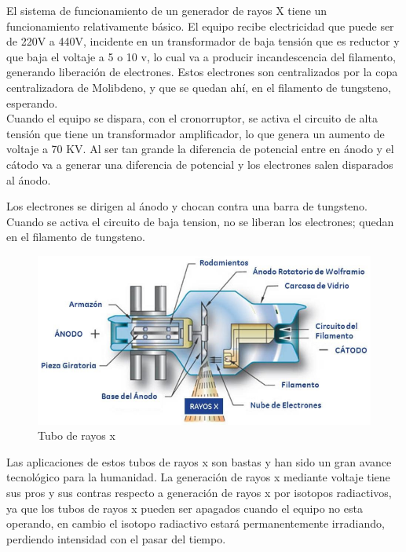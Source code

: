 El sistema de funcionamiento de un generador de rayos X tiene un funcionamiento relativamente básico.  El equipo recibe electricidad que puede ser de 220V a 440V, incidente en un transformador de baja tensión que es reductor y que baja el voltaje a 5 o 10 v, lo cual va a producir incandescencia del filamento, generando liberación de electrones. Estos electrones son centralizados por la copa centralizadora de Molibdeno, y que se quedan ahí, en el filamento de tungsteno, esperando. \\

Cuando el equipo se dispara, con el cronorruptor, se activa el circuito de alta tensión que tiene un transformador amplificador, lo que genera un aumento de voltaje a 70 KV. Al ser tan grande la diferencia de potencial entre en ánodo y el cátodo va a generar una diferencia de potencial y los electrones salen disparados al ánodo. 

Los electrones se dirigen al ánodo y chocan contra una barra de tungsteno. Cuando se activa el circuito de baja tension, no se liberan los electrones; quedan en el filamento de tungsteno.\\

\begin{figure}[H]
\centering
\includegraphics[width=12cm]{capitulo3/figs/rayos.png}
\caption{ Tubo de rayos x \cite{RADIO}}
\end{figure}

Las aplicaciones de estos tubos de rayos x son bastas y han sido un gran avance tecnológico para la humanidad. La generación de rayos x mediante voltaje tiene sus pros y sus contras respecto a generación de rayos x por isotopos radiactivos, ya que los tubos de rayos x pueden ser apagados cuando el equipo no esta operando, en cambio el isotopo radiactivo estará permanentemente irradiando, perdiendo intensidad con el pasar del tiempo.  \\


